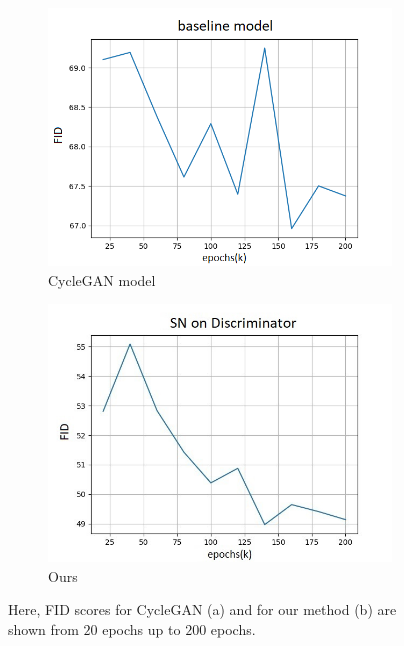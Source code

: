 \documentclass[conference]{IEEEtran}
\begin{document}
\begin{figure}[!htb]
\begin{center}
    \begin{subfigure}[b]{0.35\textwidth}
        \includegraphics[scale=0.38]{graphs/(Orig)fid_82.png}
        \caption{CycleGAN model}
        \label{subfig:fid_cycle}
    \end{subfigure}
    \begin{subfigure}[b]{0.35\textwidth}
        \includegraphics[scale=0.38]{graphs/Spectral_FID.jpg}
        \caption{Ours}
        \label{subfig:fid_spectral}
    \end{subfigure}
    \caption{Here, FID scores for CycleGAN (a) and for our method (b) are shown from $20$ epochs up to $200$ epochs.}
    \label{fig:fid_graph}
\end{center}
\end{figure}
\end{document}
